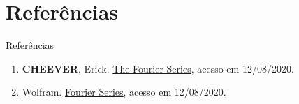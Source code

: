\section{Referências}

\begin{frame}[fragile]{Referências}

    \begin{enumerate}
        \item \textbf{CHEEVER}, Erick. \href{https://lpsa.swarthmore.edu/Fourier/Series/WhyFS.html}
            {The Fourier Series}, acesso em 12/08/2020.

        \item Wolfram. \href{https://mathworld.wolfram.com/FourierSeries.html}{Fourier Series},
            acesso em 12/08/2020.
    \end{enumerate}

\end{frame}
